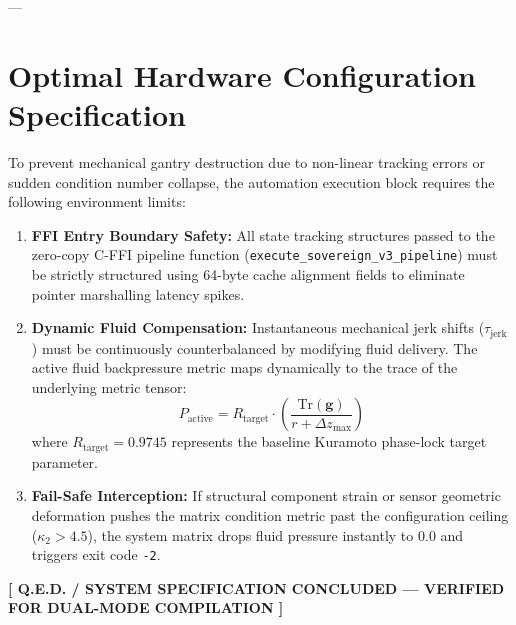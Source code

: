 \documentclass[11pt,twoside]{article}
\begin{document}
---

\section{Optimal Hardware Configuration Specification}
To prevent mechanical gantry destruction due to non-linear tracking errors or sudden condition number collapse, the automation execution block requires the following environment limits:

\begin{enumerate}
    \item \textbf{FFI Entry Boundary Safety:} All state tracking structures passed to the zero-copy C-FFI pipeline function (\texttt{execute\_sovereign\_v3\_pipeline}) must be strictly structured using 64-byte cache alignment fields to eliminate pointer marshalling latency spikes.
    \item \textbf{Dynamic Fluid Compensation:} Instantaneous mechanical jerk shifts ($\tau_{\text{jerk}}$) must be continuously counterbalanced by modifying fluid delivery. The active fluid backpressure metric maps dynamically to the trace of the underlying metric tensor:
    \begin{equation}
        P_{\text{active}} = R_{\text{target}} \cdot \left( \frac{\text{Tr}(\mathbf{g})}{r + \Delta z_{\max}} \right)
    \end{equation}
    where $R_{\text{target}} = 0.9745$ represents the baseline Kuramoto phase-lock target parameter.
    \item \textbf{Fail-Safe Interception:} If structural component strain or sensor geometric deformation pushes the matrix condition metric past the configuration ceiling ($\kappa_2 > 4.5$), the system matrix drops fluid pressure instantly to $0.0$ and triggers exit code \texttt{-2}.
\end{enumerate}

\begin{center}
    \vspace{1em}
    \textbf{[ Q.E.D. / SYSTEM SPECIFICATION CONCLUDED — VERIFIED FOR DUAL-MODE COMPILATION ]}
\end{center}
\end{document}
